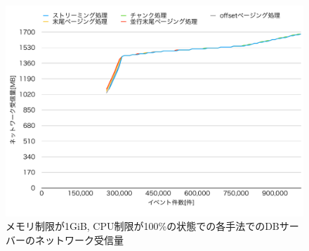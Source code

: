 \documentclass[../../../main]{subfiles}
\begin{document}
    \begin{figure}[H]
        \centering
        \includegraphics[width=12cm]{graph}
        \caption{メモリ制限が1GiB, CPU制限が100\%の状態での各手法でのDBサーバーのネットワーク受信量}
        \label{fig:db-net-in}
    \end{figure}
\end{document}
